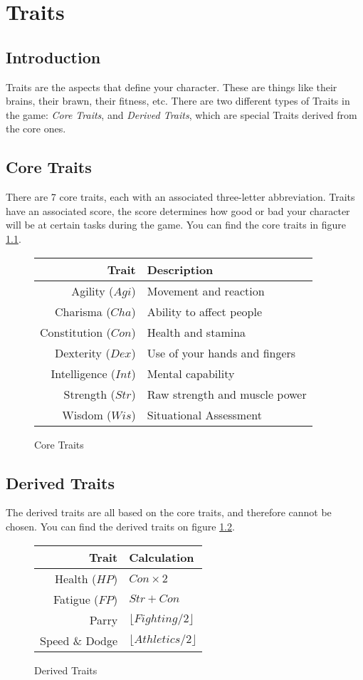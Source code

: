 \chapter{Traits}
\section{Introduction}
Traits are the aspects that define your character. These are things like their brains, their brawn, their fitness, etc. There are two different types of Traits in the game: \textit{Core Traits}, and \textit{Derived Traits}, which are special Traits derived from the core ones.
\section{Core Traits}
There are 7 core traits, each with an associated three-letter abbreviation.
Traits have an associated score, the score determines how good or bad your character will be at certain tasks during the game. You can find the core traits in figure \ref{fig:core_traits}.
\begin{figure}[!h]
    \centering
    \begin{tabular}{r | l}
        \textbf{Trait}  & \textbf{Description} \\\hline
        Agility      ($Agi$) & Movement and reaction \\
        Charisma     ($Cha$) & Ability to affect people \\
        Constitution ($Con$) & Health and stamina \\
        Dexterity    ($Dex$) & Use of your hands and fingers \\
        Intelligence ($Int$) & Mental capability \\
        Strength     ($Str$) & Raw strength and muscle power \\
        Wisdom       ($Wis$) & Situational Assessment
    \end{tabular}
    \caption{Core Traits}
    \label{fig:core_traits}
\end{figure}

\section{Derived Traits}
The derived traits are all based on the core traits, and therefore cannot be chosen. You can find the derived traits on figure \ref{fig:derived_traits}.

\begin{figure}[!ht]
    \centering
\begin{tabular}{r | l}
    \textbf{Trait}    & \textbf{Calculation} \\\hline
    Health ($HP$)     & $Con\times 2$ \\
    Fatigue ($FP$)    & $Str+Con$ \\
    Parry             & $\lfloor Fighting/2 \rfloor$\\
    Speed \& Dodge & $\lfloor Athletics / 2 \rfloor$ \\
\end{tabular}
    \caption{Derived Traits}
    \label{fig:derived_traits}
\end{figure}